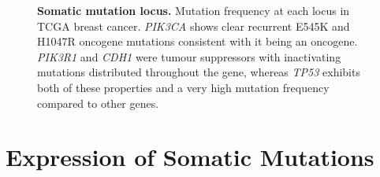 \begin{figure}[!ht]
\begin{center}
{        }
    \end{center}
    \caption[Somatic mutation locus]{\small \textbf{Somatic mutation locus.} Mutation frequency at each locus in \gls{TCGA} breast cancer. \textit{PIK3CA} shows clear recurrent E545K and H1047R oncogene mutations consistent with it being an oncogene. \textit{PIK3R1} and \textit{CDH1} were tumour suppressors with inactivating mutations distributed throughout the gene, whereas \textit{TP53} exhibits both of these properties and a very high mutation frequency compared to other genes.
}
\label{fig:mutation_locus}
\end{figure}
\fi

\iffalse
\clearpage
\section{Expression of Somatic Mutations}

